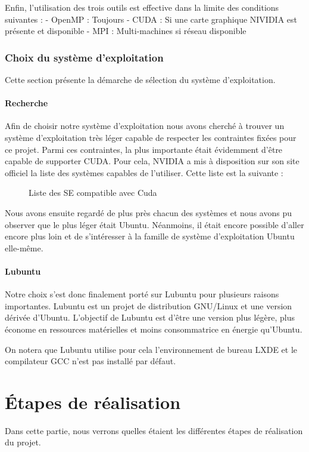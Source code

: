 \documentclass[final]{polytech/polytech}
\begin{document}
Enfin, l’utilisation des trois outils est effective dans la limite des conditions suivantes :
- OpenMP : Toujours
- CUDA : Si une carte graphique NIVIDIA est présente et disponible
- MPI : Multi-machines si réseau disponible


\section{Choix du système d'exploitation}
Cette section présente la démarche de sélection du système d’exploitation.

\subsection{Recherche}
Afin de choisir notre système d’exploitation nous avons cherché à trouver un système d’exploitation très léger capable de respecter les contraintes fixées pour ce projet. Parmi ces contraintes, la plus importante était évidemment d’être capable de supporter CUDA. Pour cela, NVIDIA a mis à disposition sur son site officiel la liste des systèmes capables de l’utiliser. Cette liste est la suivante :

\begin{figure}
	\caption{Liste des SE compatible avec Cuda}
	\label{fig:cuda_working_os}
\end{figure}

Nous avons ensuite regardé de plus près chacun des systèmes et nous avons pu observer que le plus léger était Ubuntu. Néanmoins, il était encore possible d’aller encore plus loin et de s’intéresser à la famille de système d’exploitation Ubuntu elle-même.

\subsection{Lubuntu}
Notre choix s’est donc finalement porté sur Lubuntu pour plusieurs raisons importantes. Lubuntu est un projet de distribution GNU/Linux et une version dérivée d’Ubuntu. L’objectif de Lubuntu est d’être une version plus légère, plus économe en ressources matérielles et moins consommatrice en énergie qu’Ubuntu.

On notera que Lubuntu utilise pour cela l’environnement de bureau LXDE et le compilateur GCC  n’est pas installé par défaut.

\part{Étapes de réalisation} %
Dans cette partie, nous verrons quelles étaient les différentes étapes de réalisation du projet.
\end{document}
